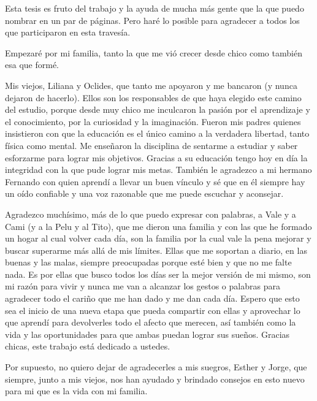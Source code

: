 \documentclass[
11pt, %
english, %
onehalfspacing, %
nolistspacing, %
headsepline, %
consistentlayout, %
]{MastersDoctoralThesis} %
\begin{document}
\begin{acknowledgements}
\addchaptertocentry{\acknowledgementname} %

  Esta tesis es fruto del trabajo y la ayuda de mucha más gente que la que
  puedo nombrar en un par de páginas. Pero haré lo posible para agradecer a
  todos los que participaron en esta travesía.

  Empezaré por mi familia, tanto la que me vió crecer desde chico como también
  esa que formé.

  Mis viejos, Liliana y Oclides, que tanto me apoyaron y me bancaron (y nunca
  dejaron de hacerlo). Ellos son los responsables de que haya elegido este
  camino del estudio, porque desde muy chico me inculcaron la pasión por el
  aprendizaje y el conocimiento, por la curiosidad y la imaginación. Fueron mis
  padres quienes insistieron con que la educación es el único camino a la
  verdadera libertad, tanto física como mental. Me enseñaron la disciplina de
  sentarme a estudiar y saber esforzarme para lograr mis objetivos. Gracias a
  su educación tengo hoy en día la integridad con la que pude lograr mis metas.
  También le agradezco a mi hermano Fernando con quien aprendí a llevar un buen
  vínculo y sé que en él siempre hay un oído confiable y una voz razonable que
  me puede escuchar y aconsejar.  

  Agradezco muchísimo, más de lo que puedo expresar con palabras, a Vale y a
  Cami (y a la Pelu y al Tito), que me dieron una familia y con las que he
  formado un hogar al cual volver cada día, son la familia por la cual vale la
  pena mejorar y buscar superarme más allá de mis límites.  Ellas que me
  soportan a diario, en las buenas y las malas, siempre preocupadas porque esté
  bien y que no me falte nada. Es por ellas que busco todos los días ser la
  mejor versión de mi mismo, son mi razón para vivir y nunca me van a alcanzar
  los gestos o palabras para agradecer todo el cariño que me han dado y me dan
  cada día. Espero que esto sea el inicio de una nueva etapa que pueda
  compartir con ellas y aprovechar lo que aprendí para devolverles todo el
  afecto que merecen, así también como la vida y las oportunidades para que
  ambas puedan lograr sus sueños. Gracias chicas, este trabajo está dedicado a
  ustedes. 

  Por supuesto, no quiero dejar de agradecerles a mis suegros, Esther y Jorge,
  que siempre, junto a mis viejos, nos han ayudado y brindado consejos en esto
  nuevo para mi que es la vida con mi familia.


\end{acknowledgements}
\end{document}
